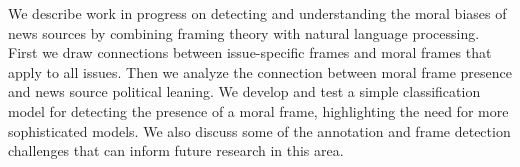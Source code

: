 We describe work in progress on detecting and understanding the moral biases of news sources by combining framing theory with natural language processing. First we draw connections between issue-specific frames and moral frames that apply to all issues. Then we analyze the connection between moral frame presence and news source political leaning. We develop and test a simple classification model for detecting the presence of a moral frame, highlighting the need for more sophisticated models.  We also discuss some of the annotation and frame detection challenges that can inform future research in this area.
